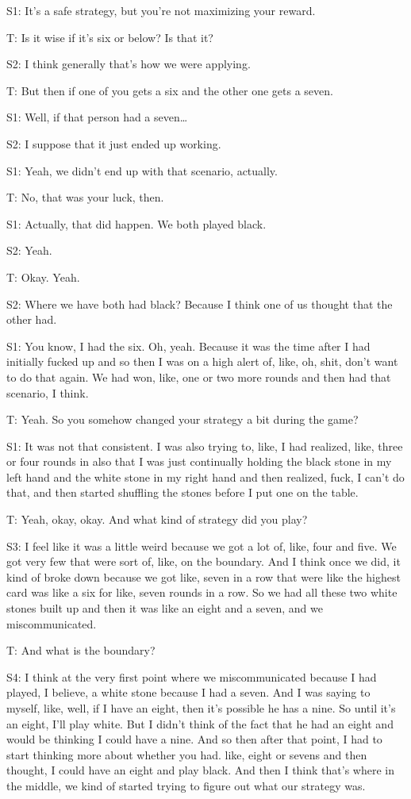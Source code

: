 \documentclass[a4paper,superscriptaddress,nofootinbib]{revtex4}
\begin{document}
S1: It's a safe strategy, but you're not maximizing your reward.

T: Is it wise if it's six or below? Is that it?

S2: I think generally that’s how we were applying. 

T: But then if one of you gets a six and the other one gets a seven. 

S1: Well, if that person had a seven…

S2: I suppose that it just ended up working.

S1: Yeah, we didn't end up with that scenario, actually. 

T: No, that was your luck, then. 

S1: Actually, that did happen. We both played black. 

S2: Yeah. 

T: Okay. Yeah. 

S2: Where we have both had black? Because I think one of us thought that the other had.

S1: You know, I had the six. Oh, yeah. Because it was the time after I had initially fucked up and so then I was on a high alert of, like, oh, shit, don't want to do that again. We had won, like, one or two more rounds and then had that scenario, I think. 

T: Yeah. So you somehow changed your strategy a bit during the game?

S1: It was not that consistent. I was also trying to, like, I had realized, like, three or four rounds in also that I was just continually holding the black stone in my left hand and the white stone in my right hand and then realized, fuck, I can't do that, and then started shuffling the stones before I put one on the table.

T: Yeah, okay, okay. And what kind of strategy did you play? 

S3: I feel like it was a little weird because we got a lot of, like, four and five. We got very few that were sort of, like, on the boundary. And I think once we did, it kind of broke down because we got like, seven in a row that were like the highest card was like a six for like, seven rounds in a row. So we had all these two white stones built up and then it was like an eight and a seven, and we miscommunicated. 

T: And what is the boundary? 

S4: I think at the very first point where we miscommunicated because I had played, I believe, a white stone because I had a seven. And I was saying to myself, like, well, if I have an eight, then it's possible he has a nine. So until it's an eight, I'll play white. But I didn't think of the fact that he had an eight and would be thinking I could have a nine. And so then after that point, I had to start thinking more about whether you had. like, eight or sevens and then thought, I could have an eight and play black. And then I think that's where in the middle, we kind of started trying to figure out what our strategy was. 
\end{document}
